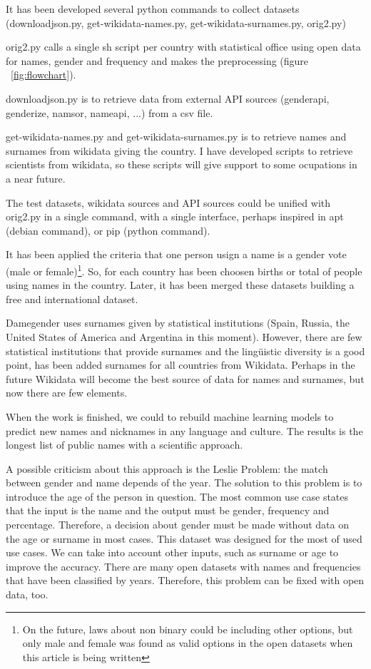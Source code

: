 \documentclass[a4paper]{article}
\begin{document}
It has been developed several python commands to collect datasets
(downloadjson.py, get-wikidata-names.py, get-wikidata-surnames.py,
orig2.py)

orig2.py calls a single sh script per country with statistical office
using open data for names, gender and frequency and makes the preprocessing
(figure ~\ref{fig:flowchart}).

downloadjson.py is to retrieve data from external API sources (genderapi,
genderize, namsor, nameapi, ...) from a csv file.

get-wikidata-names.py and get-wikidata-surnames.py is to retrieve names
and surnames from wikidata giving the country. I have developed scripts
to retrieve scientists from wikidata, so these scripts will give support to
some ocupations in a near future.

The test datasets, wikidata sources and API sources could be unified
with orig2.py in a single command, with a single interface,
perhaps inspired in apt (debian command), or pip (python command).

It has been applied the criteria that one person usign a name is
a gender vote (male or female)\footnote{On the future, laws about
non binary could be including other options, but only male and
female was found as valid options in the open datasets when this
article is being written}. So, for each country has been choosen
births or total of people using names in the country. Later, it
has been merged these datasets building a free and international
dataset. 

Damegender uses surnames given by statistical institutions (Spain,
Russia, the United States of America and Argentina in this moment).
However, there are few statistical institutions that provide
surnames and the lingüistic diversity is a good point, has been
added surnames for all countries from Wikidata. Perhaps in the future
Wikidata will become the best source of data for names and surnames,
but now there are few elements.

When the work is finished, we could to rebuild machine learning models
to predict new names and nicknames in any language and culture. The
results is the longest list of public names with a scientific approach.

A possible criticism about this approach is the Leslie
Problem\cite{blevins2015jane}: the match between gender and name
depends of the year. The solution to this problem is to introduce the
age of the person in question. The most common use case states that
the input is the name and the output must be gender, frequency and
percentage. Therefore, a decision about gender must be made without
data on the age or surname in most cases. This dataset was designed for
the most of used use cases. We can take into account other inputs,
such as surname or age to improve the accuracy. There are many open
datasets with names and frequencies that have been classified by years.
Therefore, this problem can be fixed with open data, too.
\end{document}
